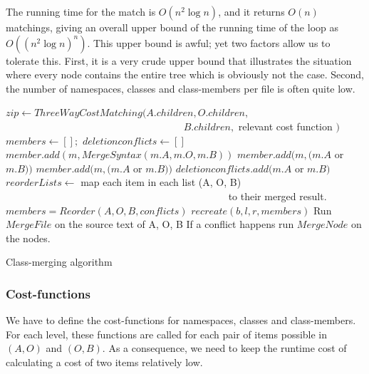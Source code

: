 \documentclass[11pt]{article}
\begin{document}
The running time for the match is $O(n^2 \log n)$, and it returns $O(n)$ matchings, giving an overall upper bound of the running time of the loop as $O((n^2 \log n)^n)$. This upper bound is awful; yet two factors allow us to tolerate this. First, it is a very crude upper bound that illustrates the situation where every node contains the entire tree which is obviously not the case. Second, the number of namespaces, classes and class-members per file is often quite low.

\begin{algorithm}
\begin{algorithmic}
        \State $zip  \gets ThreeWayCostMatching(A.children, O.children,$
        \State ~~~~~~~~~~~~~~~~~~~~~~~~~~~~~~~~~~~  $B.children,$ relevant cost function $)$  
        \State $members \gets [];$
        \State $deletionconflicts \gets []$
               \State $member.add(m, MergeSyntax(m.A, m.O, m.B))$
              \State $member.add(m, (m.A$ or $m.B ))$
               \State $member.add(m, (m.A$ or $m.B ))$
               \State $deletionconflicts.add(m.A$ or $m.B )$
           \EndIf
           \State $reorderLists \gets $ map each item in each list (A, O, B)
           \State ~~~~~~~~~~~~~~~~~~~~~~~~~~~~~~~~~~~~~~~~~~~~ to their merged result.
           \State $members = Reorder(A, O, B, conflicts)$
       \EndFor
       \State \Return $recreate(b, l, r, members)$
       \State Run $MergeFile$ on the source text of A, O, B
       \State If a conflict happens run $MergeNode$ on the nodes.
    \EndIf
\EndFunction
\end{algorithmic}
\caption{Class-merging algorithm}
\label{TreeMergeAlgorithm}
\end{algorithm}

\subsubsection{Cost-functions}
We have to define the cost-functions for namespaces, classes and class-members. For each level, these functions are called for each pair of items possible in $(A, O)$ and $(O, B)$. As a consequence, we need to keep the runtime cost of calculating a cost of two items relatively low.
\end{document}
